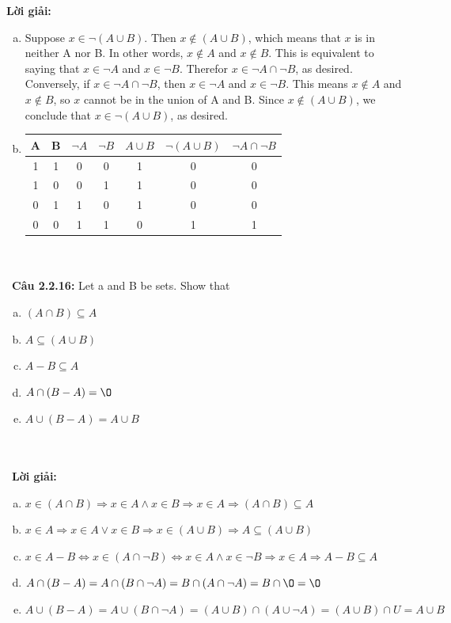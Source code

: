 \documentclass[a4paper]{article}
\begin{document}
\textbf{Lời giải:} \begin{enumerate}[a)]
\item Suppose $x \in \lnot(A \cup B)$. Then  $x \notin (A \cup B)$, which means that $x$ is in neither A nor B. In other words, $x \notin A$ and $x \notin B$. This is equivalent to saying that $x \in \lnot A$ and $x \in \lnot B$. Therefor $x \in \lnot A \cap \lnot B$, as desired. Conversely, if $x \in \lnot A \cap \lnot B$, then $x \in \lnot A$ and $x \in \lnot B$. This means $x \notin A$ and $x \notin B$, so $x$ cannot be in the union of A and B. Since $x \notin (A \cup B)$, we conclude that  $x \in \lnot(A \cup B)$, as desired.
\item \begin{tabular}{|c|c|c|c|c|c|c|}
\hline 
A & B & $\lnot A$ & $\lnot B$ & $A \cup B$ & $\lnot (A \cup B)$ & $\lnot A \cap \lnot B$ \\ 
\hline 
1 & 1 & 0 & 0 & 1 & 0 & 0 \\ 
\hline 
1 & 0 & 0 & 1 & 1 & 0 & 0 \\ 
\hline 
0 & 1 & 1 & 0 & 1 & 0 & 0 \\ 
\hline 
0 & 0 & 1 & 1 & 0 & 1 & 1 \\ 
\hline 
\end{tabular} 
\end{enumerate}
 \\\ \\\
\textbf{Câu 2.2.16: } Let a and B be sets. Show that
\begin{enumerate}[a)]
\item $(A \cap B) \subseteq A$
\item $A \subseteq (A \cup B) $
\item $A-B \subseteq A$
\item $A \cap (B-A)= \O$
\item $A \cup (B-A)= A \cup B$
\end{enumerate} \\\ \\\
\textbf{Lời giải:} \begin{enumerate}[a)]
\item $x \in (A \cap B) \Rightarrow x \in A \land x \in B \Rightarrow x \in A \Rightarrow (A \cap B) \subseteq A$
\item $x \in A \Rightarrow x \in A \lor x \in B \Rightarrow x \in (A \cup B) \Rightarrow A \subseteq (A \cup B) $
\item $x \in A-B \Leftrightarrow x \in (A \cap \lnot B) \Leftrightarrow x \in A \land x \in \lnot B \Rightarrow x \in A \Rightarrow A-B \subseteq A$
\item $A \cap (B-A)=A \cap (B \cap \lnot A)=B \cap (A \cap \lnot A)=B \cap \O =\O$
\item $A \cup (B-A)=A \cup (B \cap \lnot A)=(A \cup B) \cap (A \cup \lnot A)=(A \cup B) \cap U=A \cup B$
\end{enumerate} \\\ \\\
\end{document}
